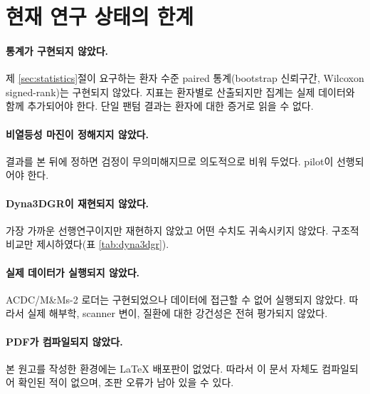 \section{현재 연구 상태의 한계}


\paragraph{통계가 구현되지 않았다.}
제 \ref{sec:statistics}절이 요구하는 환자 수준 paired 통계(bootstrap 신뢰구간,
Wilcoxon signed-rank)는 구현되지 않았다. 지표는 환자별로 산출되지만 집계는 실제
데이터와 함께 추가되어야 한다. 단일 팬텀 결과는 환자에 대한 증거로 읽을 수 없다.

\paragraph{비열등성 마진이 정해지지 않았다.}
결과를 본 뒤에 정하면 검정이 무의미해지므로 의도적으로 비워 두었다. pilot이 선행되어야
한다.

\paragraph{Dyna3DGR이 재현되지 않았다.}
가장 가까운 선행연구이지만 재현하지 않았고 어떤 수치도 귀속시키지 않았다. 구조적
비교만 제시하였다(표 \ref{tab:dyna3dgr}).

\paragraph{실제 데이터가 실행되지 않았다.}
ACDC/M\&Ms-2 로더는 구현되었으나 데이터에 접근할 수 없어 실행되지 않았다. 따라서
실제 해부학, scanner 변이, 질환에 대한 강건성은 전혀 평가되지 않았다.

\paragraph{PDF가 컴파일되지 않았다.}
본 원고를 작성한 환경에는 \LaTeX{} 배포판이 없었다. 따라서 이 문서 자체도 컴파일되어
확인된 적이 없으며, 조판 오류가 남아 있을 수 있다.

